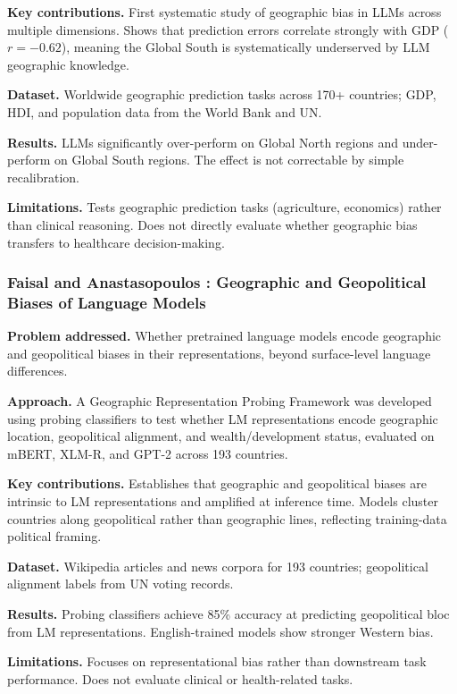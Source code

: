 \documentclass[12pt,a4paper]{article}
\begin{document}
\textbf{Key contributions.}
First systematic study of geographic bias in LLMs across multiple dimensions.
Shows that prediction errors correlate strongly with GDP ($r=-0.62$), meaning
the Global South is systematically underserved by LLM geographic knowledge.

\textbf{Dataset.}
Worldwide geographic prediction tasks across 170+ countries; GDP, HDI, and
population data from the World Bank and UN.

\textbf{Results.}
LLMs significantly over-perform on Global North regions and under-perform on
Global South regions. The effect is not correctable by simple recalibration.

\textbf{Limitations.}
Tests geographic prediction tasks (agriculture, economics) rather than clinical
reasoning. Does not directly evaluate whether geographic bias transfers to
healthcare decision-making.

\subsubsection*{Faisal and Anastasopoulos \cite{faisal2022}: Geographic and
Geopolitical Biases of Language Models}

\textbf{Problem addressed.}
Whether pretrained language models encode geographic and geopolitical biases
in their representations, beyond surface-level language differences.

\textbf{Approach.}
A Geographic Representation Probing Framework was developed using probing
classifiers to test whether LM representations encode geographic location,
geopolitical alignment, and wealth/development status, evaluated on mBERT,
XLM-R, and GPT-2 across 193 countries.

\textbf{Key contributions.}
Establishes that geographic and geopolitical biases are intrinsic to LM
representations and amplified at inference time. Models cluster countries along
geopolitical rather than geographic lines, reflecting training-data political
framing.

\textbf{Dataset.}
Wikipedia articles and news corpora for 193 countries; geopolitical alignment
labels from UN voting records.

\textbf{Results.}
Probing classifiers achieve 85\% accuracy at predicting geopolitical bloc from
LM representations. English-trained models show stronger Western bias.

\textbf{Limitations.}
Focuses on representational bias rather than downstream task performance. Does
not evaluate clinical or health-related tasks.
\end{document}
